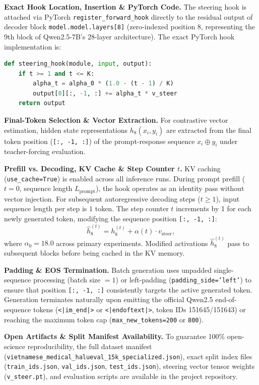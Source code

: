 \textbf{Exact Hook Location, Insertion \& PyTorch Code.} The steering hook is attached via PyTorch \texttt{register\_forward\_hook} directly to the residual output of decoder block \texttt{model.model.layers[8]} (zero-indexed position 8, representing the 9th block of Qwen2.5-7B's 28-layer architecture). The exact PyTorch hook implementation is:
\begin{lstlisting}[language=Python,basicstyle=\ttfamily\small]
def steering_hook(module, input, output):
    if t >= 1 and t <= K:
        alpha_t = alpha_0 * (1.0 - (t - 1) / K)
        output[0][:, -1, :] += alpha_t * v_steer
    return output
\end{lstlisting}

\textbf{Final-Token Selection \& Vector Extraction.} For contrastive vector estimation, hidden state representations $h_8(x_i, y_i)$ are extracted from the final token position (\texttt{[:, -1, :]}) of the prompt-response sequence $x_i \oplus y_i$ under teacher-forcing evaluation.

\textbf{Prefill vs. Decoding, KV Cache \& Step Counter $t$.} KV caching (\texttt{use\_cache=True}) is enabled across all inference runs. During prompt prefill ($t=0$, sequence length $L_{\text{prompt}}$), the hook operates as an identity pass without vector injection. For subsequent autoregressive decoding steps ($t \ge 1$), input sequence length per step is $1$ token. The step counter $t$ increments by 1 for each newly generated token, modifying the sequence position \texttt{[:, -1, :]}:
\begin{equation}
\hat{h}_8^{(t)} = h_8^{(t)} + \alpha(t) \cdot v_{\text{steer}},
\end{equation}
where $\alpha_0 = 18.0$ across primary experiments. Modified activations $\hat{h}_8^{(t)}$ pass to subsequent blocks before being cached in the KV memory.

\textbf{Padding \& EOS Termination.} Batch generation uses unpadded single-sequence processing (batch size $= 1$) or left-padding (\texttt{padding\_side='left'}) to ensure that position \texttt{[:, -1, :]} consistently targets the active generated token. Generation terminates naturally upon emitting the official Qwen2.5 end-of-sequence tokens (\texttt{<|im\_end|>} or \texttt{<|endoftext|>}, token IDs 151645/151643) or reaching the maximum token cap (\texttt{max\_new\_tokens=200} or \texttt{800}).

\textbf{Open Artifacts \& Split Manifest Availability.} To guarantee 100\% open-science reproducibility, the full dataset manifest (\texttt{vietnamese\_medical\_halueval\_15k\_specialized.json}), exact split index files (\texttt{train\_ids.json}, \texttt{val\_ids.json}, \texttt{test\_ids.json}), steering vector tensor weights (\texttt{v\_steer.pt}), and evaluation scripts are available in the project repository.

